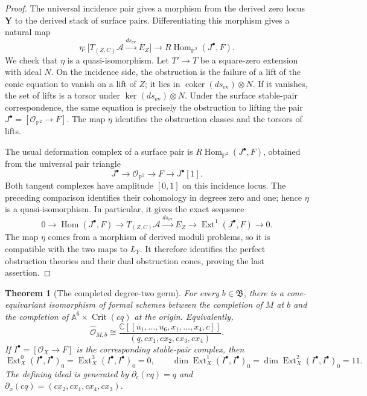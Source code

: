 \documentclass[11pt,reqno]{amsart}
\newtheorem{theorem}{Theorem}[section]
\theoremstyle{definition}
\newcommand{\C}{\mathbb C}
\newcommand{\Pp}{\mathbb P}
\newcommand{\Ocal}{\mathcal O}
\newcommand{\Hom}{\operatorname{Hom}}
\begin{document}
\begin{proof}
The universal incidence pair gives a morphism from the derived zero locus
$\mathbf Y$ to the derived stack of surface pairs.  Differentiating this
morphism gives a natural map
\[
 \eta:\bigl[T_{(Z,C)}\mathcal A\xrightarrow{d s_{\mathrm{ev}}}E_Z\bigr]
 \longrightarrow
 R\!\operatorname{Hom}_{\Pp^2}(J^\bullet,F).
\]
We check that $\eta$ is a quasi-isomorphism.  Let $T'\to T$ be a square-zero
extension with ideal $N$.  On the incidence side, the obstruction is the
failure of a lift of the conic equation to vanish on a lift of $Z$; it lies
in $\operatorname{coker}(d s_{\mathrm{ev}})\otimes N$.  If it vanishes, the
set of lifts is a torsor under
$\ker(d s_{\mathrm{ev}})\otimes N$.  Under the surface stable-pair
correspondence, the same equation is precisely the obstruction to lifting
the pair $J^\bullet=[\Ocal_{\Pp^2}\to F]$.  The map $\eta$ identifies the
obstruction classes and the torsors of lifts.

The usual deformation complex of a surface pair is
$R\!\operatorname{Hom}_{\Pp^2}(J^\bullet,F)$, obtained from the universal
pair triangle
\[
 J^\bullet\longrightarrow\Ocal_{\Pp^2}\longrightarrow F
 \longrightarrow J^\bullet[1].
\]
Both tangent complexes have amplitude $[0,1]$ on this incidence locus.
The preceding comparison identifies their cohomology in degrees zero and
one; hence $\eta$ is a quasi-isomorphism.  In particular, it gives the exact
sequence
\[
 0\longrightarrow\Hom(J^\bullet,F)
 \longrightarrow T_{(Z,C)}\mathcal A
 \xrightarrow{d s_{\mathrm{ev}}}E_Z
 \longrightarrow\operatorname{Ext}^1(J^\bullet,F)\longrightarrow0.
\]
The map $\eta$ comes from a morphism of derived moduli problems, so it is
compatible with the two maps to $L_Y$.  It therefore identifies the perfect
obstruction theories and their dual obstruction cones, proving the last
assertion.
\end{proof}

\begin{theorem}[The completed degree-two germ]
\label{thm:degree-two-classical-germ}
For every $b\in\mathfrak B$, there is a cone-equivariant isomorphism of
formal schemes between the completion of $M$ at $b$ and the completion of
$\mathbb A^6\times\operatorname{Crit}(cq)$ at the origin.  Equivalently,
\[
 \widehat{\Ocal}_{M,b}\cong
 \frac{\C[[u_1,\ldots,u_6,x_1,\ldots,x_4,c]]}
 {(q,cx_1,cx_2,cx_3,cx_4)}.
\]
If $I^\bullet=[\Ocal_X\to F]$ is the corresponding stable-pair complex,
then
\[
 \operatorname{Ext}_X^0(I^\bullet,I^\bullet)_0=
 \operatorname{Ext}_X^3(I^\bullet,I^\bullet)_0=0,
 \qquad
 \dim\operatorname{Ext}_X^1(I^\bullet,I^\bullet)_0
 =\dim\operatorname{Ext}_X^2(I^\bullet,I^\bullet)_0=11.
\]
The defining ideal is generated by
$\partial_c(cq)=q$ and
$\partial_x(cq)=(cx_2,cx_1,cx_4,cx_3)$.
\end{theorem}
\end{document}
